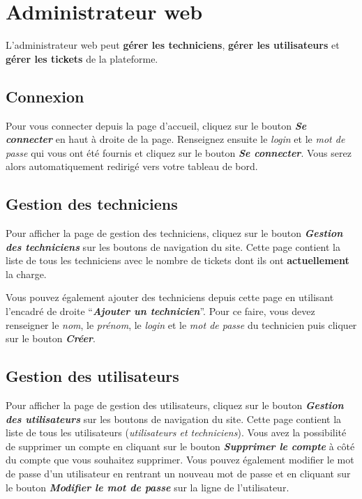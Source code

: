 \documentclass[12pt, a4paper]{article}
\begin{document}
\section{Administrateur web}

L'administrateur web peut \textbf{gérer les techniciens}, \textbf{gérer les utilisateurs} et \textbf{gérer les tickets} de la plateforme.

\subsection*{Connexion}

Pour vous connecter depuis la page d'accueil, cliquez sur le bouton \textit{\textbf{Se connecter}} en haut à droite de la page.
Renseignez ensuite le \textit{login} et le \textit{mot de passe} qui vous ont été fournis et cliquez sur le bouton \textit{\textbf{Se connecter}}.
Vous serez alors automatiquement redirigé vers votre tableau de bord.

\subsection*{Gestion des techniciens}

Pour afficher la page de gestion des techniciens, cliquez sur le bouton \textit{\textbf{Gestion des techniciens}} sur les boutons de navigation du site.
Cette page contient la liste de tous les techniciens avec le nombre de tickets dont ils ont \textbf{actuellement} la charge.

\bigskip
\noindent Vous pouvez également ajouter des techniciens depuis cette page en utilisant l'encadré de droite ``\textit{\textbf{Ajouter un technicien}}''.
Pour ce faire, vous devez renseigner le \textit{nom}, le \textit{prénom}, le \textit{login} et le \textit{mot de passe} du technicien puis cliquer sur le bouton \textit{\textbf{Créer}}.

\subsection*{Gestion des utilisateurs}

Pour afficher la page de gestion des utilisateurs, cliquez sur le bouton \textit{\textbf{Gestion des utilisateurs}} sur les boutons de navigation du site.
Cette page contient la liste de tous les utilisateurs (\textit{utilisateurs et techniciens}).
Vous avez la possibilité de supprimer un compte en cliquant sur le bouton \textit{\textbf{Supprimer le compte}} à côté du compte que vous souhaitez supprimer.
Vous pouvez également modifier le mot de passe d'un utilisateur en rentrant un nouveau mot de passe et en cliquant sur le bouton \textit{\textbf{Modifier le mot de passe}} sur la ligne de l'utilisateur.
\end{document}
